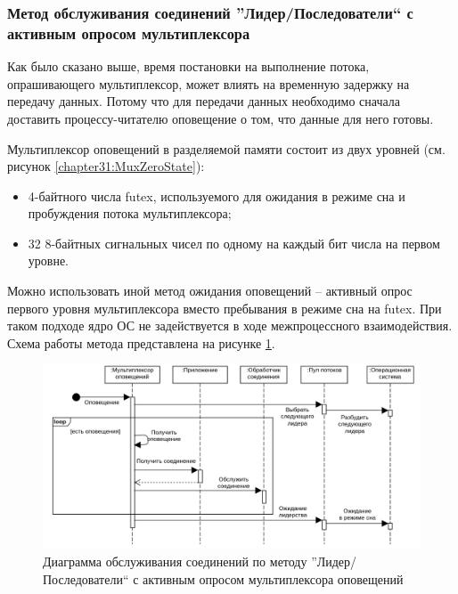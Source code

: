 \subsubsection{Метод обслуживания соединений ''Лидер/Последователи`` с активным опросом мультиплексора}\label{chapter31:NonBlockingLF}

Как было сказано выше, время постановки на выполнение потока, опрашивающего мультиплексор, может влиять на временную задержку на передачу данных. Потому что для передачи данных необходимо сначала доставить процессу-читателю оповещение о том, что данные для него готовы.

Мультиплексор оповещений в разделяемой памяти состоит из двух уровней (см. рисунок \ref{chapter31:MuxZeroState}):
\begin{itemize}
\item 4-байтного числа futex, используемого для ожидания в режиме сна и пробуждения потока мультиплексора;
\item 32 8-байтных сигнальных чисел по одному на каждый бит числа на первом уровне.
\end{itemize}

Можно использовать иной метод ожидания оповещений -- активный опрос первого уровня мультиплексора вместо пребывания в режиме сна на futex. При таком подходе ядро ОС не задействуется в ходе межпроцессного взаимодействия.
Схема работы метода представлена на рисунке \ref{chapter31:MuxBusyWaitScheme}.

\begin{figure}[!h]
\caption{Диаграмма обслуживания соединений по методу ''Лидер/Последователи`` с активным опросом мультиплексора оповещений}
\label{chapter31:MuxBusyWaitScheme}
\includegraphics[width=\textwidth]{../../graphics/schemes/LFMuxSequenceSpin}
\end{figure}

